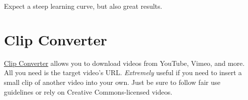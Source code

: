 \documentclass[]{book}
\theoremstyle{definition}
\theoremstyle{definition}
\theoremstyle{definition}
\theoremstyle{remark}
\begin{document}
Expect a steep learning curve, but also great results.

\hypertarget{clip-converter}{%
\section{Clip Converter}\label{clip-converter}}

\href{http://www.clipconverter.cc/}{Clip Converter} allows you to
download videos from YouTube, Vimeo, and more. All you need is the
target video's URL. \emph{Extremely} useful if you need to insert a
small clip of another video into your own. Just be sure to follow fair
use guidelines or rely on Creative Commons-licensed videos.


\end{document}
